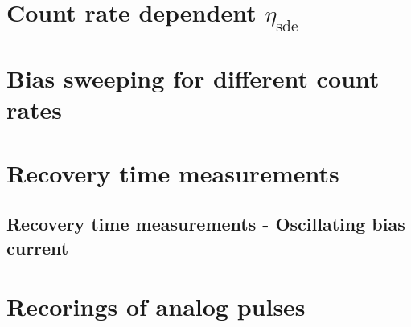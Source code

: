 

\section{Count rate dependent $\eta_{\text{sde}}$}\label{sec:countrate_sde_results_appendix}



\section{Bias sweeping for different count rates}\label{sec:bias_sweeping_countrate_appendix}

\section{Recovery time measurements}\label{sec:Recovery time measurements_appendix}

\subsection{Recovery time measurements - Oscillating bias current} \label{subsec:recovery-time-measurements---oscillating_bias_current}

\section{Recorings of analog pulses}\label{sec:analog_pulse_recordings_appendix}


